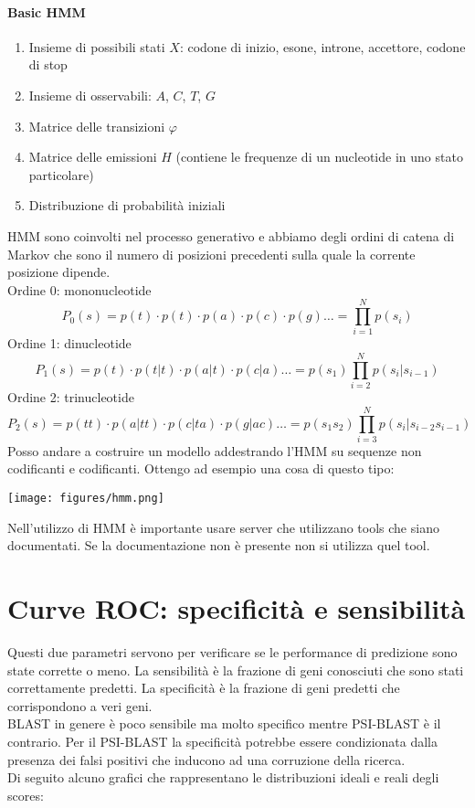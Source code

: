 \documentclass{article}
\begin{document}
\paragraph{Basic HMM}
\begin{enumerate}
    \item Insieme di possibili stati $X$: codone di inizio, esone, introne, accettore, codone di stop
    \item Insieme di osservabili: $A$, $C$, $T$, $G$
    \item Matrice delle transizioni $\varphi$
    \item Matrice delle emissioni $H$ (contiene le frequenze di un nucleotide in uno stato particolare)
    \item Distribuzione di probabilità iniziali    
\end{enumerate}
HMM sono coinvolti nel processo generativo e abbiamo degli ordini di catena di Markov che sono il numero di posizioni precedenti sulla quale la corrente posizione dipende. \\
Ordine 0: mononucleotide
$$ P_0(s) = p(t) \cdot p(t) \cdot p(a) \cdot p(c) \cdot p(g) \dots = \prod^N_{i = 1} p(s_i)$$
Ordine 1: dinucleotide
$$ P_1(s) = p(t) \cdot p(t|t) \cdot p(a|t) \cdot p(c|a) \dots = p(s_1)\prod^N_{i = 2} p(s_i|s_{i-1})$$
Ordine 2: trinucleotide
$$ P_2(s) = p(tt) \cdot p(a|tt) \cdot p(c|ta) \cdot p(g|ac) \dots = p(s_1s_2)\prod^N_{i = 3} p(s_i|s_{i-2}s_{i-1})$$
Posso andare a costruire un modello addestrando l’HMM su sequenze non codificanti e codificanti. Ottengo ad esempio una cosa di questo tipo:
\begin{center}
    \texttt{[image: figures/hmm.png]}
\end{center}
Nell’utilizzo di HMM è importante usare server che utilizzano tools che siano documentati. Se la documentazione non è presente non si utilizza quel tool.
\section{Curve ROC: specificità e sensibilità}
Questi due parametri servono per verificare se le performance di predizione sono state corrette o meno. La sensibilità è la frazione di geni conosciuti che sono stati correttamente predetti. La specificità è la frazione di geni predetti che corrispondono a veri geni.\\
BLAST in genere è poco sensibile ma molto specifico mentre PSI-BLAST è il contrario. Per il PSI-BLAST la specificità potrebbe essere condizionata dalla presenza dei falsi positivi che inducono ad una corruzione della ricerca.\\
Di seguito alcuno grafici che rappresentano le distribuzioni ideali e reali degli scores:
\end{document}
